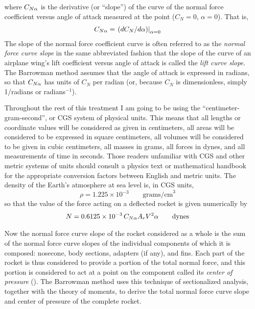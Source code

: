 where $C_{N\alpha}$ is the derivative (or ``slope'') of the curve of the normal force
coefficient versus angle of attack measured at the point ($C_N = 0$,
$\alpha = 0$). That is,
\begin{equation*}
C_{N\alpha} = \left.(dC_N/d\alpha)\right|_{\alpha = 0}
\end{equation*}
The slope of the normal force coefficient curve is often referred to as the
\emph{normal force curve slope} in the same abbreviated fashion that the
slope of the curve of an airplane wing's lift coefficient versus angle of
attack is called the \emph{lift curve slope}. The Barrowman method assumes
that the angle of attack is expressed in radians, so that $C_{N\alpha}$ has units of
$C_N$ per radian (or, because $C_N$ is dimensionless, simply 1/radians or
radians$^{-1}$).

Throughout the rest of this treatment I am going to be using the
``centimeter-gram-second'', or CGS system of physical units. This means that
all lengths or coordinate values will be considered as given in centimeters,
all areas will be considered to be expressed in square centimeters, all
volumes will be considered to be given in cubic centimeters, all masses in
grams, all forces in dynes, and all measurements of time in seconds. Those
readers unfamiliar with CGS and other metric systems of units should consult
a physics text or mathematical handbook for the appropriate conversion
factors between English and metric units. The density of the Earth's
atmosphere at sea level is, in CGS units,
\begin{equation*}
\rho = 1.225 \times 10^{-3} \qquad \text{grams/cm}^{3}
\end{equation*}
so that the value of the force acting on a deflected rocket is given
numerically by
\begin{equation*}
N = 0.6125 \times 10^{-3}\,C_{N\alpha} A_r V^{2}\alpha \qquad \text{dynes}
\end{equation*}

Now the normal force curve slope of the rocket considered as a whole is the
sum of the normal force curve slopes of the individual components of which
it is composed: nosecone, body sections, adapters (if any), and fins. Each
part of the rocket is thus considered to provide a portion of the total
normal force, and this portion is considered to act at a point on the
component called its \emph{center of pressure} (\CP). The Barrowman method
uses this technique of sectionalized analysis, together with the theory of
moments, to derive the total normal force curve slope and center of pressure
of the complete rocket.

